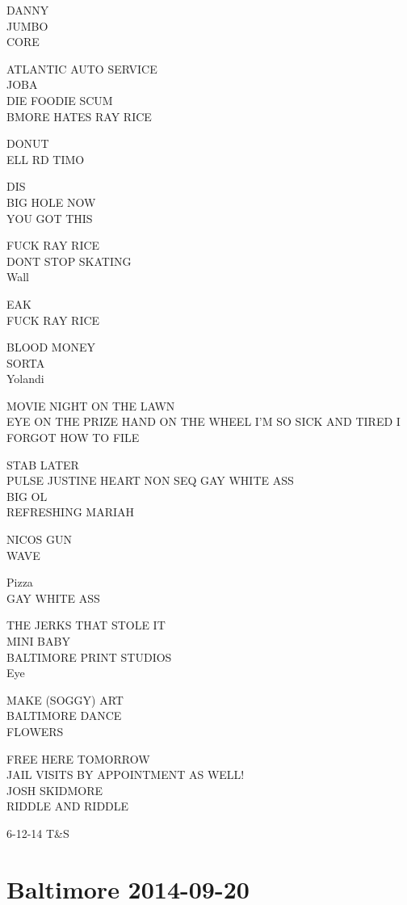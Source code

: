 \documentclass[10pt,letterpaper]{article}
\begin{document}
DANNY\\
JUMBO\\
CORE

ATLANTIC AUTO SERVICE\\
JOBA\\
DIE FOODIE SCUM\\
BMORE HATES RAY RICE

DONUT\\
ELL RD TIMO

DIS\\
BIG HOLE NOW\\
YOU GOT THIS

FUCK RAY RICE\\
DONT STOP SKATING\\
Wall

EAK\\
FUCK RAY RICE

BLOOD MONEY\\
SORTA\\
Yolandi

MOVIE NIGHT ON THE LAWN\\
EYE ON THE PRIZE HAND ON THE WHEEL I'M SO SICK AND TIRED I FORGOT HOW TO FILE

STAB LATER\\
PULSE JUSTINE HEART NON SEQ GAY WHITE ASS\\
BIG OL\\
REFRESHING MARIAH

NICOS GUN\\
WAVE

Pizza\\
GAY WHITE ASS

THE JERKS THAT STOLE IT\\
MINI BABY\\
BALTIMORE PRINT STUDIOS\\
Eye

MAKE (SOGGY) ART\\
BALTIMORE DANCE\\
FLOWERS

FREE HERE TOMORROW\\
JAIL VISITS BY APPOINTMENT AS WELL!\\
JOSH SKIDMORE\\
RIDDLE AND RIDDLE

6{-}12{-}14 T\&S
\

\section*{Baltimore 2014-09-20}
\end{document}
